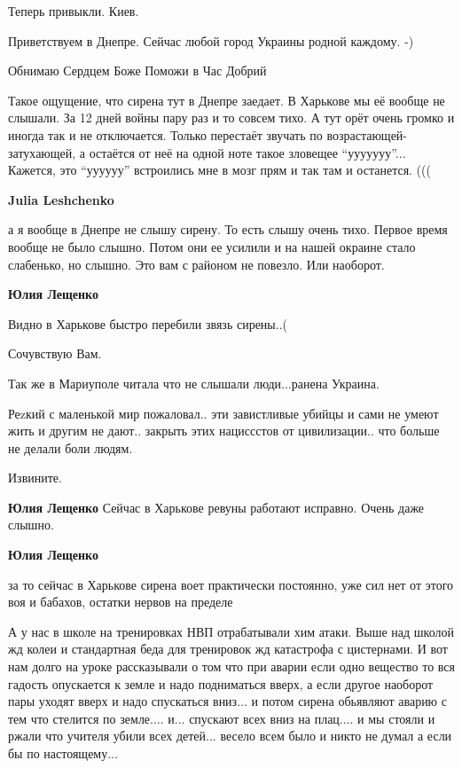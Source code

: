 \begin{itemize}
Теперь привыкли. Киев.

Приветствуем в Днепре. Сейчас любой город Украины родной каждому. -)

Обнимаю Сердцем
Боже Поможи в Час Добрий


Такое ощущение, что сирена тут в Днепре заедает. В Харькове мы её вообще не
слышали. За 12 дней войны пару раз и то совсем тихо. А тут орёт очень громко и
иногда так и не отключается. Только перестаёт звучать по
возрастающей-затухающей, а остаётся от неё на одной ноте такое зловещее
\enquote{ууууууу}... Кажется, это \enquote{уууууу} встроились мне в мозг прям и так там и
останется. (((

\begin{itemize} %
\textbf{Julia Leshchenko} 

а я вообще в Днепре не слышу сирену. То есть слышу очень тихо. Первое время
вообще не было слышно. Потом они ее усилили и на нашей окраине стало слабенько,
но слышно. Это вам с районом не повезло. Или наоборот.

\textbf{Юлия Лещенко} 

Видно в Харькове быстро перебили звязь сирены..(

Сочувствую Вам.

Так же в Мариуполе читала что не слышали люди...ранена Украина.

Реzкий с маленькой мир пожаловал.. эти завистливые убийцы и сами не умеют жить и
другим не дают.. закрыть этих нациссстов от цивилизации.. что
больше не делали боли людям.

Извините.

\textbf{Юлия Лещенко} Сейчас в Харькове ревуны работают исправно. Очень даже слышно.

\textbf{Юлия Лещенко} 

за то сейчас в Харькове сирена воет практически постоянно, уже сил нет от этого
воя и бабахов, остатки нервов на пределе


А у нас в школе на тренировках НВП отрабатывали хим атаки. Выше над школой жд
колеи и стандартная беда для тренировок жд катастрофа с цистернами. И вот нам
долго на уроке рассказывали о том что при аварии если одно вещество то вся
гадость опускается к земле и надо подниматься вверх, а если другое наоборот
пары уходят вверх и надо спускаться вниз... и потом сирена обьявляют аварию с
тем что стелится по земле.... и... спускают всех вниз на плац.... и мы стояли и
ржали что учителя убили всех детей... весело всем было и никто не думал а если
бы по настоящему...


\end{itemize}
\end{itemize}
